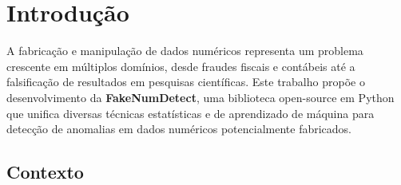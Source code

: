 \documentclass[
    12pt,                %
    openright,           %
    oneside,             %
    a4paper,             %
    english,             %
    brazil               %
]{abntex2}
\begin{document}
\textual

\chapter{Introdução}
\label{cap:introducao}

A fabricação e manipulação de dados numéricos representa um problema crescente em múltiplos domínios, desde fraudes fiscais e contábeis até a falsificação de resultados em pesquisas científicas. Este trabalho propõe o desenvolvimento da \textbf{FakeNumDetect}, uma biblioteca open-source em Python que unifica diversas técnicas estatísticas e de aprendizado de máquina para detecção de anomalias em dados numéricos potencialmente fabricados.

\section{Contexto}
\label{sec:contexto}
\end{document}
